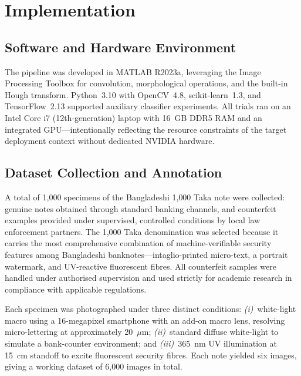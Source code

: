 \documentclass[journal]{IEEEtran}
\begin{document}
\section{Implementation}
\label{sec:implementation}

\subsection{Software and Hardware Environment}

The pipeline was developed in MATLAB R2023a, leveraging the Image Processing Toolbox for convolution, morphological operations, and the built-in Hough transform. Python~3.10 with OpenCV~4.8, scikit-learn~1.3, and TensorFlow~2.13 supported auxiliary classifier experiments. All trials ran on an Intel Core i7 (12th-generation) laptop with 16~GB DDR5 RAM and an integrated GPU---intentionally reflecting the resource constraints of the target deployment context without dedicated NVIDIA hardware.

\subsection{Dataset Collection and Annotation}

A total of 1,000 specimens of the Bangladeshi 1{,}000 Taka note were collected: genuine notes obtained through standard banking channels, and counterfeit examples provided under supervised, controlled conditions by local law enforcement partners. The 1,000 Taka denomination was selected because it carries the most comprehensive combination of machine-verifiable security features among Bangladeshi banknotes---intaglio-printed micro-text, a portrait watermark, and UV-reactive fluorescent fibres. All counterfeit samples were handled under authorised supervision and used strictly for academic research in compliance with applicable regulations.

Each specimen was photographed under three distinct conditions: \textit{(i)}~white-light macro using a 16-megapixel smartphone with an add-on macro lens, resolving micro-lettering at approximately 20~$\mu$m; \textit{(ii)}~standard diffuse white-light to simulate a bank-counter environment; and \textit{(iii)}~365~nm UV illumination at 15~cm standoff to excite fluorescent security fibres. Each note yielded six images, giving a working dataset of 6{,}000 images in total.
\end{document}
